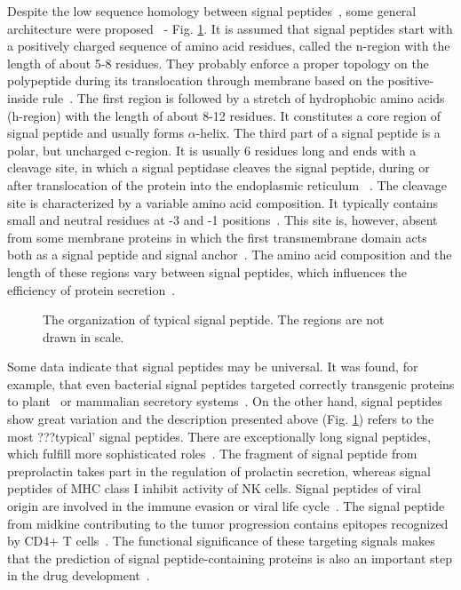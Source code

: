 \documentclass[10pt,letterpaper]{article}
\begin{document}
Despite the low sequence homology between signal peptides~\cite{1999ladungaphysean}, some general architecture were proposed~\cite{1994izardsignal, 2013vossmechanism} - Fig. \ref{fig:sparch}. It is assumed that signal peptides start with a positively charged sequence of amino acid residues, called the n-region with the length of about 5-8 residues. They probably enforce a proper topology on the polypeptide during its translocation through membrane based on the positive-inside rule~\cite{1988vonheijnetopogenic}. The first region is followed by a stretch of hydrophobic amino acids (h-region) with the length of about 8-12 residues. It constitutes a core region of signal peptide and usually forms $\alpha$-helix. The third part of a signal peptide is a polar, but uncharged c-region. It is usually 6 residues long and ends with a cleavage site, in which a signal peptidase cleaves the signal peptide, during or after translocation of the protein into the endoplasmic reticulum ~\cite{2002paetzelsignal}. The cleavage site is characterized by a variable amino acid composition. It typically contains small and neutral residues at -3 and -1 positions~\cite{1994palzkillselection}. This site is, however, absent from some membrane proteins in which the first transmembrane domain acts both as a signal peptide and signal anchor~\cite{1988szczesnaskorupapositive}. The amino acid composition and the length of these regions vary between signal peptides, which influences the efficiency of protein secretion~\cite{2006hegdethe}.

\begin{figure}[ht]\centering
\caption{The organization of typical signal peptide. The regions are not drawn in scale.}
\label{fig:sparch}
\end{figure}


Some data indicate that signal peptides may be universal. It was found, for example, that even bacterial signal peptides targeted correctly transgenic proteins to plant~\cite{2009moellera} or mammalian secretory systems~\cite{2014naganoestablishment}. On the other hand, signal peptides show great variation and the description presented above (Fig. \ref{fig:sparch}) refers to the most ???typical’ signal peptides. There are  exceptionally long signal peptides, which fulfill more sophisticated roles~\cite{2009hissarchitecture}. The fragment of signal peptide from preprolactin takes part in the regulation of prolactin secretion, whereas signal peptides of MHC class I inhibit activity of NK cells. Signal peptides of viral origin are involved in the immune evasion or viral life cycle~\cite{2000kappposttargeting}. The signal peptide from midkine contributing to the tumor progression contains epitopes recognized by CD4+ T cells~\cite{2013kerzerhothe}. The functional significance of these targeting signals makes that the prediction of signal peptide-containing proteins is also an important step in the drug development~\cite{2005zhangalteration, 2012netoadeimproving, 2010moellerwetmilling}.
\end{document}
